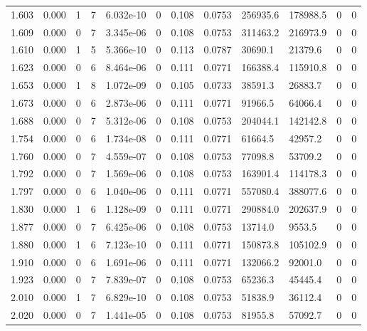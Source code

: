 \documentclass[preview]{standalone}
\begin{document}
{{{\begin{tabular}{L{1.2cm}C{1.2cm} C{0.3cm}C{0.5cm} C{1.4cm}C{1.4cm} C{1.4cm}C{1.4cm} C{1.6cm}C{1.6cm} C{1.6cm}C{1.6cm}}
  1.603  &  0.000  & 1     &  7 &  6.032e-10  & 0  &  0.108&   0.0753& 256935.6 & 178988.5   &  0 & 0  \\ 
  1.609  &  0.000  & 0     &  7 &  3.345e-06  & 0  &  0.108&   0.0753& 311463.2 & 216973.9   &  0 & 0  \\ 
  1.610  &  0.000  & 1     &  5 &  5.366e-10  & 0  &  0.113&   0.0787& 30690.1 & 21379.6   &  0 & 0  \\ 
  1.623  &  0.000  & 0     &  6 &  8.464e-06  & 0  &  0.111&   0.0771& 166388.4 & 115910.8   &  0 & 0  \\ 
  1.653  &  0.000  & 1     &  8 &  1.072e-09  & 0  &  0.105&   0.0733& 38591.3 & 26883.7   &  0 & 0  \\ 
  1.673  &  0.000  & 0     &  6 &  2.873e-06  & 0  &  0.111&   0.0771& 91966.5 & 64066.4   &  0 & 0  \\ 
  1.688  &  0.000  & 0     &  7 &  5.312e-06  & 0  &  0.108&   0.0753& 204044.1 & 142142.8   &  0 & 0  \\ 
  1.754  &  0.000  & 0     &  6 &  1.734e-08  & 0  &  0.111&   0.0771& 61664.5 & 42957.2   &  0 & 0  \\ 
  1.760  &  0.000  & 0     &  7 &  4.559e-07  & 0  &  0.108&   0.0753& 77098.8 & 53709.2   &  0 & 0  \\ 
  1.792  &  0.000  & 0     &  7 &  1.569e-06  & 0  &  0.108&   0.0753& 163901.4 & 114178.3   &  0 & 0  \\ 
  1.797  &  0.000  & 0     &  6 &  1.040e-06  & 0  &  0.111&   0.0771& 557080.4 & 388077.6   &  0 & 0  \\ 
  1.830  &  0.000  & 1     &  6 &  1.128e-09  & 0  &  0.111&   0.0771& 290884.0 & 202637.9   &  0 & 0  \\ 
  1.877  &  0.000  & 0     &  7 &  6.425e-06  & 0  &  0.108&   0.0753& 13714.0 & 9553.5   &  0 & 0  \\ 
  1.880  &  0.000  & 1     &  6 &  7.123e-10  & 0  &  0.111&   0.0771& 150873.8 & 105102.9   &  0 & 0  \\ 
  1.910  &  0.000  & 0     &  6 &  1.691e-06  & 0  &  0.111&   0.0771& 132066.2 & 92001.0   &  0 & 0  \\ 
  1.923  &  0.000  & 0     &  7 &  7.839e-07  & 0  &  0.108&   0.0753& 65236.3 & 45445.4   &  0 & 0  \\ 
  2.010  &  0.000  & 1     &  7 &  6.829e-10  & 0  &  0.108&   0.0753& 51838.9 & 36112.4   &  0 & 0  \\ 
  2.020  &  0.000  & 0     &  7 &  1.441e-05  & 0  &  0.108&   0.0753& 81955.8 & 57092.7   &  0 & 0  \\ 

\end{tabular}}}}
\end{document}
